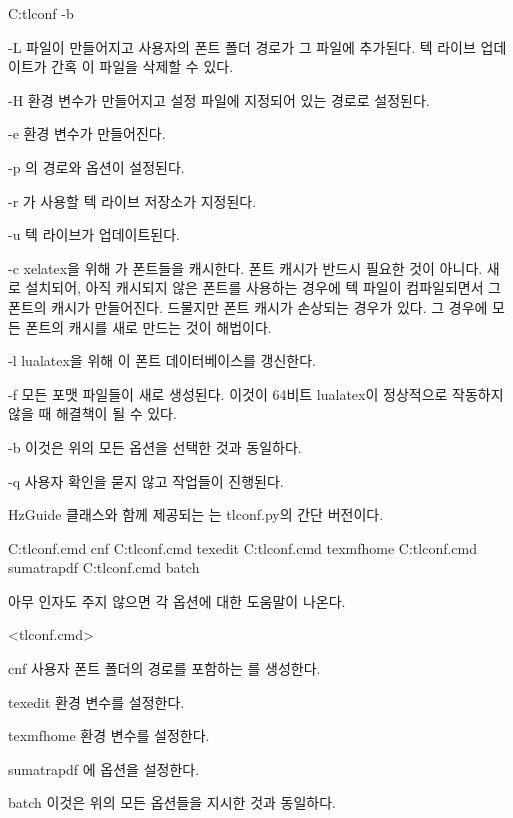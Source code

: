 \begin{code}
C:\>tlconf -b
\end{code}

\begin{macros}
\item[-L]  파일이 만들어지고 사용자의 폰트 폴더 경로가 그 파일에 추가된다.
텍 라이브 업데이트가 간혹 이 파일을 삭제할 수 있다.
\item[-H]  환경 변수가 만들어지고 설정 파일에 지정되어 있는 경로로 설정된다.
\item[-e]  환경 변수가 만들어진다.
\item[-p] 의 경로와  옵션이 설정된다. 
\item[-r] 가 사용할 텍 라이브 저장소가 지정된다.
\item[-u] 텍 라이브가 업데이트된다.
\item[-c] xelatex을 위해 가 폰트들을 캐시한다.
폰트 캐시가 반드시 필요한 것이 아니다.
새로 설치되어, 아직 캐시되지 않은 폰트를 사용하는 경우에 텍 파일이 컴파일되면서 그 폰트의 캐시가 만들어진다. 
드물지만 폰트 캐시가 손상되는 경우가 있다. 
그 경우에 모든 폰트의 캐시를 새로 만드는 것이 해법이다.
\item[-l] lualatex을 위해 이 폰트 데이터베이스를 갱신한다.
\item[-f] 모든 포맷 파일들이 새로 생성된다. 이것이 64비트 lualatex이 정상적으로 작동하지 않을 때 해결책이 될 수 있다.
\item[-b] 이것은 위의 모든 옵션을 선택한 것과 동일하다.
\item[-q] 사용자 확인을 묻지 않고 작업들이 진행된다.
\end{macros}

HzGuide 클래스와 함께 제공되는 는 tlconf.py의 간단 버전이다.

\begin{codewrite}
C:\>tlconf.cmd cnf
C:\>tlconf.cmd texedit
C:\>tlconf.cmd texmfhome
C:\>tlconf.cmd sumatrapdf
C:\>tlconf.cmd batch
\end{codewrite}
\coderead

아무 인자도 주지 않으면 각 옵션에 대한 도움말이 나온다.

\begin{macros}<tlconf.cmd>
\item[cnf] 사용자 폰트 폴더의 경로를 포함하는 를 생성한다.
\item[texedit]  환경 변수를 설정한다.
\item[texmfhome]  환경 변수를 설정한다.
\item[sumatrapdf] 에  옵션을 설정한다.
\item[batch] 이것은 위의 모든 옵션들을 지시한 것과 동일하다.
\end{macros}

